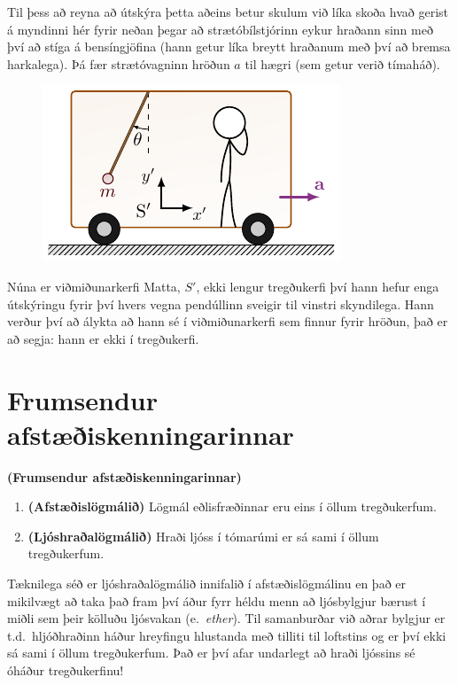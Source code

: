 Til þess að reyna að útskýra þetta aðeins betur skulum við líka skoða hvað gerist á myndinni hér fyrir neðan þegar að strætóbílstjórinn eykur hraðann sinn með því að stíga á bensíngjöfina (hann getur líka breytt hraðanum með því að bremsa harkalega). Þá fær strætóvagninn hröðun $a$ til hægri (sem getur verið tímaháð).

\begin{figure}[H]
    \centering
    \includegraphics[width=.45\textwidth]{figures/ekkitregdukerfi.pdf}
\end{figure}

Núna er viðmiðunarkerfi Matta, $S'$, ekki lengur tregðukerfi því hann hefur enga útskýringu fyrir því hvers vegna pendúllinn sveigir til vinstri skyndilega. Hann verður því að álykta að hann sé í viðmiðunarkerfi sem finnur fyrir hröðun, það er að segja: hann er ekki í tregðukerfi. \\


\section{Frumsendur afstæðiskenningarinnar}

\begin{tcolorbox}
\begin{theorem}
\textbf{(Frumsendur afstæðiskenningarinnar)}
\begin{enumerate}[label = \textbf{(\arabic*)}]
    \item \textbf{(Afstæðislögmálið)} Lögmál eðlisfræðinnar eru eins í öllum tregðukerfum.
    \item \textbf{(Ljóshraðalögmálið)} Hraði ljóss í tómarúmi er sá sami í öllum tregðukerfum.
\end{enumerate}
\end{theorem}
\end{tcolorbox}

Tæknilega séð er ljóshraðalögmálið innifalið í afstæðislögmálinu en það er mikilvægt að taka það fram því áður fyrr héldu menn að ljósbylgjur bærust í miðli sem þeir kölluðu ljósvakan (e.~\emph{ether}). Til samanburðar við aðrar bylgjur er t.d.~hljóðhraðinn háður hreyfingu hlustanda með tilliti til loftstins og er því ekki sá sami í öllum tregðukerfum. Það er því afar undarlegt að hraði ljóssins sé óháður tregðukerfinu!

